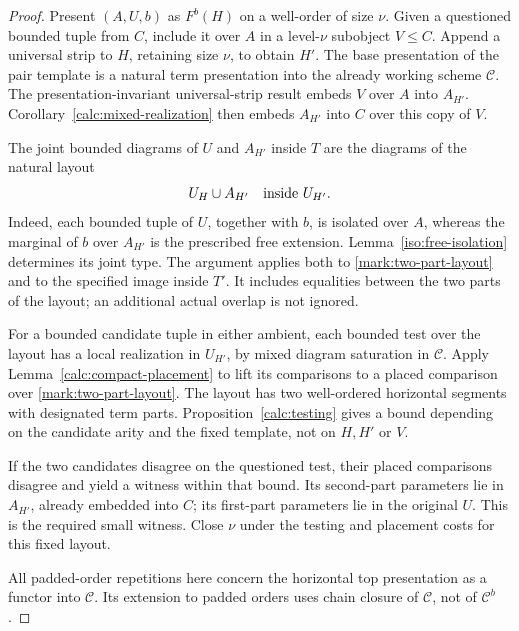 \begin{proof}
Present \((A,U,b)\) as \(F^b(H)\) on a well-order of size \(\nu\).
Given a questioned bounded tuple from \(C\), include it over
\(A\) in a level-\(\nu\) subobject \(V\leq C\).
Append a universal strip to \(H\), retaining size \(\nu\), to
obtain \(H'\).  The base presentation of the pair template is
a natural term presentation into the already working scheme
\(\mathcal C\).  The presentation-invariant universal-strip
result embeds \(V\) over \(A\) into \(A_{H'}\).
Corollary~\ref{calc:mixed-realization} then embeds \(A_{H'}\) into
\(C\) over this copy of \(V\).

The joint bounded diagrams of \(U\) and \(A_{H'}\) inside \(T\)
are the diagrams of the natural layout
\begin{equation}
                         U_H\cup A_{H'}
                 \quad\hbox{inside }U_{H'}.
                 \label{mark:two-part-layout}
\end{equation}
Indeed, each bounded tuple of \(U\), together with \(b\),
is isolated over \(A\), whereas the marginal of \(b\)
over \(A_{H'}\) is the prescribed free extension.
Lemma~\ref{iso:free-isolation} determines its joint type.
The argument applies both to \eqref{mark:two-part-layout}
and to the specified image inside \(T'\).  It includes
equalities between the two parts of the layout; an
additional actual overlap is not ignored.

For a bounded candidate tuple in either ambient, each
bounded test over the layout has a local realization
in \(U_{H'}\), by mixed diagram saturation in
\(\mathcal C\).  Apply Lemma~\ref{calc:compact-placement}
to lift its comparisons to a placed comparison over
\eqref{mark:two-part-layout}.  The layout has two
well-ordered horizontal segments with designated term
parts.  Proposition~\ref{calc:testing} gives a bound depending
on the candidate arity and the fixed template, not on
\(H,H'\) or \(V\).

If the two candidates disagree on the questioned test,
their placed comparisons disagree and yield a witness
within that bound.  Its second-part parameters lie in
\(A_{H'}\), already embedded into \(C\); its first-part
parameters lie in the original \(U\).  This is the
required small witness.  Close \(\nu\) under the
testing and placement costs for this fixed layout.

All padded-order repetitions here concern the
horizontal top presentation as a functor into
\(\mathcal C\).  Its extension to padded orders uses
chain closure of \(\mathcal C\), not of
\(\mathcal C^b\).
\end{proof}

